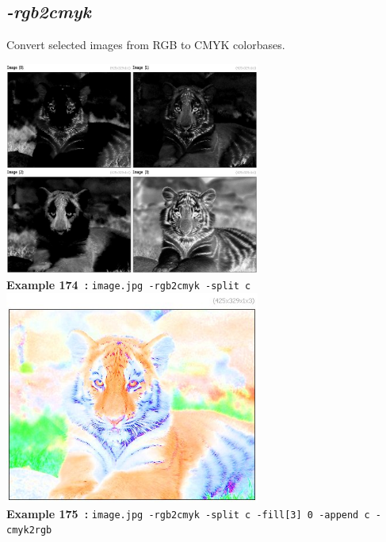\documentclass[a4paper,11pt,twoside]{book}
\begin{document}
\subsection{\emph{-rgb2cmyk} }\vspace*{-0.5em}
Convert selected images from RGB to CMYK colorbases.
\begin{center}\includegraphics[keepaspectratio=true,height=7cm,width=\textwidth]{img/gmic_def174.jpg}\\
{\footnotesize \textbf{Example 174~:} \texttt{image.jpg -rgb2cmyk -split c}}
\\\includegraphics[keepaspectratio=true,height=7cm,width=\textwidth]{img/gmic_def175.jpg}\\
{\footnotesize \textbf{Example 175~:} \texttt{image.jpg -rgb2cmyk -split c -fill[3] 0 -append c -cmyk2rgb}}
\end{center}
\end{document}
